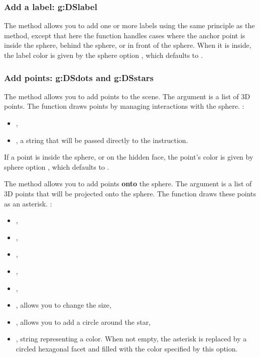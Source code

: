 \subsubsection{Add a label: g:DSlabel}

The  method allows you to add one or more labels using the same principle as the  method, except that here the function handles cases where the anchor point is inside the sphere, behind the sphere, or in front of the sphere. When it is inside, the label color is given by the sphere option , which defaults to .

\subsubsection{Add points: g:DSdots and g:DSstars}

The  method allows you to add points to the scene. The  argument is a list of 3D points. The function draws points by managing interactions with the sphere. \writeoptions:
\begin{itemize}
    \item {},
    \item {}, a string that will be passed directly to the \drawcmd instruction.
\end{itemize}

If a point is inside the sphere, or on the hidden face, the point's color is given by sphere option , which defaults to .

The  method allows you to add points \textbf{onto} the sphere. The  argument is a list of 3D points that will be projected onto the sphere. The function draws these points as an asterisk. \writeoptions:
\begin{itemize}
    \item {},
    \item {},
    \item {},
    \item {},
    \item {},
    \item {}, allows you to change the size,
    \item {}, allows you to add a circle around the star,
    \item {}, string representing a color. When not empty, the asterisk is replaced by a circled hexagonal facet and filled with the color specified by this option.
\end{itemize}

